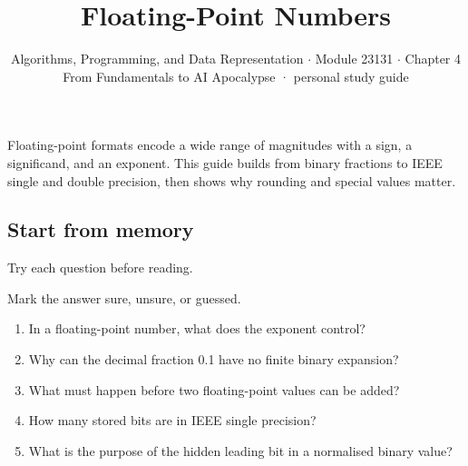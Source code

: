 \documentclass[11pt]{article}
\title{\sffamily\bfseries\color{FAUblue}Floating-Point Numbers}
\author{Algorithms, Programming, and Data Representation \ensuremath{\cdot} Module 23131 \ensuremath{\cdot} Chapter 4\\[2pt]\small From Fundamentals to AI Apocalypse · personal study guide}
\date{}
\begin{document}
\maketitle
\begingroup\footnotesize\setlength{\parskip}{0pt}\tableofcontents\endgroup
\clearpage

{\large Floating-point formats encode a wide range of magnitudes with a sign, a significand, and an exponent. This guide builds from binary fractions to IEEE single and double precision, then shows why rounding and special values matter.}


\begin{keepsection}
\section{Start from memory}

Try each question before reading.

Mark the answer sure, unsure, or guessed.

\begin{enumerate}
\item In a floating-point number, what does the exponent control?
\item Why can the decimal fraction 0.1 have no finite binary expansion?
\item What must happen before two floating-point values can be added?
\item How many stored bits are in IEEE single precision?
\item What is the purpose of the hidden leading bit in a normalised binary value?
\end{enumerate}

\end{keepsection}
\end{document}
